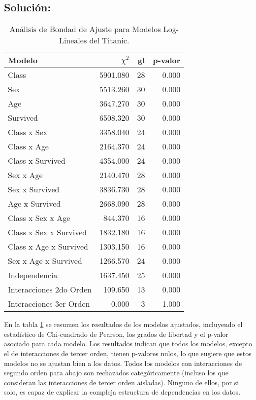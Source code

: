 \documentclass[paper=letter, fontsize=11pt, draft=false]{scrartcl}\usepackage[]{graphicx}\usepackage[]{xcolor}
\numberwithin{equation}{problemcounter} %
\numberwithin{figure}{problemcounter} %
\numberwithin{table}{problemcounter} %
\numberwithin{subsection}{problemcounter}
\begin{document}
\subsection{\textbf{Solución:}}




\begin{table}[htbp]
\centering
\begin{tabular}{|l|rrr|}
\hline
\textbf{Modelo} & \textbf{$\chi^2$} & \textbf{gl} & \textbf{p-valor} \\
\hline
Class & 5901.080 & 28 & 0.000 \\
Sex & 5513.260 & 30 & 0.000 \\
Age & 3647.270 & 30 & 0.000 \\
Survived & 6508.320 & 30 & 0.000 \\
Class x Sex & 3358.040 & 24 & 0.000 \\
Class x Age & 2164.370 & 24 & 0.000 \\
Class x Survived & 4354.000 & 24 & 0.000 \\
Sex x Age & 2140.470 & 28 & 0.000 \\
Sex x Survived & 3836.730 & 28 & 0.000 \\
Age x Survived & 2668.090 & 28 & 0.000 \\
Class x Sex x Age & 844.370 & 16 & 0.000 \\
Class x Sex x Survived & 1832.180 & 16 & 0.000 \\
Class x Age x Survived & 1303.150 & 16 & 0.000 \\
Sex x Age x Survived & 1266.570 & 24 & 0.000 \\
Independencia & 1637.450 & 25 & 0.000 \\
Interacciones 2do Orden & 109.650 & 13 & 0.000 \\
Interacciones 3er Orden & 0.000 & 3 & 1.000 \\
\hline
\end{tabular}
\caption{Análisis de Bondad de Ajuste para Modelos Log-Lineales del Titanic.}
\label{tab:resumen_modelos}
\end{table}

En la tabla \ref{tab:resumen_modelos} se resumen los resultados de los modelos ajustados, incluyendo el estadístico de Chi-cuadrado de Pearson, los grados de libertad y el p-valor asociado para cada modelo. Los resultados indican que todos los modelos, excepto el de interacciones de tercer orden, tienen p-valores nulos, lo que sugiere que estos modelos no se ajustan bien a los datos. Todos los modelos con interacciones de segundo orden para abajo son rechazados categóricamente (incluso los que consideran las interacciones de tercer orden aisladas). Ninguno de ellos, por si solo, es capaz de explicar la compleja estructura de dependencias en los datos. 
\end{document}
